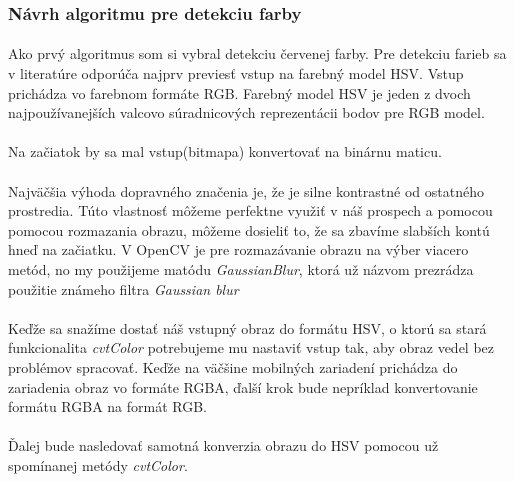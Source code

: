 \documentclass[12pt]{article}
\begin{document}
\subsubsection{Návrh algoritmu pre detekciu farby}
\paragraph{}
Ako prvý algoritmus som si vybral detekciu červenej farby. Pre detekciu farieb sa v literatúre odporúča najprv previesť vstup na farebný model HSV. 
Vstup prichádza vo farebnom formáte RGB. Farebný model HSV je jeden z dvoch najpoužívanejších valcovo súradnicových reprezentácii bodov pre RGB model.
\cite{hsl_hsv_wiki_en}
\paragraph{}
Na začiatok by sa mal vstup(bitmapa) konvertovať na binárnu maticu.
\paragraph{}
Najväčšia výhoda dopravného značenia je, že je silne kontrastné od ostatného prostredia.
Túto vlastnosť môžeme perfektne využiť v náš prospech a pomocou pomocou rozmazania obrazu, môžeme dosieliť to,
že sa zbavíme slabších kontú hneď na začiatku. V OpenCV je pre rozmazávanie obrazu na výber viacero metód,
no my použijeme matódu \emph{GaussianBlur}, ktorá už názvom prezrádza použitie známeho filtra \emph{Gaussian blur}
\paragraph{}
Keďže sa snažíme dostať náš vstupný obraz do formátu HSV, o ktorú sa stará funkcionalita \emph{cvtColor} 
potrebujeme mu nastaviť vstup tak, aby obraz vedel bez problémov spracovať. 
Keďže na väčšine mobilných zariadení prichádza do zariadenia obraz vo formáte RGBA, ďalší krok bude nepríklad konvertovanie formátu RGBA na formát RGB.
\paragraph{}
Ďalej bude nasledovať samotná konverzia obrazu do HSV pomocou už spomínanej metódy \emph{cvtColor}.
\end{document}
